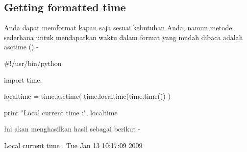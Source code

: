 \documentclass[a4paper,12pt]{report}
\begin{document}
\subsection*{Getting formatted time}
 \par
\begin{adjustwidth}{0.03in}{0.03in}
 \hspace*{0.5in} Anda dapat memformat kapan saja sesuai kebutuhan Anda, namun metode sederhana untuk mendapatkan waktu dalam format yang mudah dibaca adalah asctime () -\end{adjustwidth}
 \par
\noindent 
 \hspace*{0.5in}  $  \#  $!/usr/bin/python \par
\noindent 
 \hspace*{0.5in} import time; \par
\vspace{12pt}
\noindent 
 \hspace*{0.5in} localtime = time.asctime( time.localtime(time.time()) ) \par
\noindent 
 \hspace*{0.5in} print "Local current time :", localtime \par
\vspace{12pt}
\begin{adjustwidth}{0.03in}{0.03in}
Ini akan menghasilkan hasil sebagai berikut -\end{adjustwidth}
 \par
\noindent 
 \hspace*{0.5in} Local current time : Tue Jan 13 10:17:09 2009 \par
\vspace{12pt}
\vspace{20pt}
\end{document}
